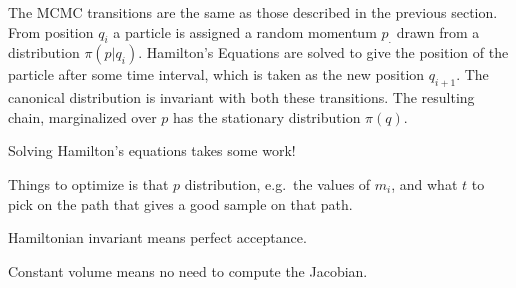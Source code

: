 \documentclass[11pt, oneside]{article}   	%
\begin{document}
The MCMC transitions are the same as those described in the previous section.
From position $q_i$ a particle is assigned a random momentum $p_.$
drawn from a distribution $\pi(p|q_i)$.  
Hamilton's Equations are solved to give the position of the particle after some time interval,
which is taken as the new position $q_{i+1}$.  The canonical distribution
is invariant with both these transitions.  The resulting chain, marginalized over $p$ has
the stationary distribution $\pi(q)$.

Solving Hamilton's equations takes some work!

Things to optimize is that $p$ distribution, e.g.\ the values of $m_i$, and what $t$ to pick on the path
that gives a good sample on that path.

Hamiltonian invariant means perfect acceptance.

Constant volume means no need to compute the Jacobian.
\end{document}
